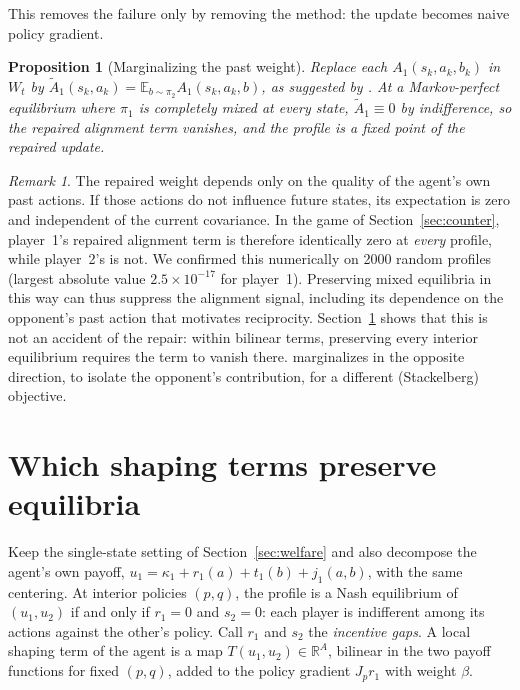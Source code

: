 \documentclass[11pt]{article}
\newtheorem{proposition}{Proposition}
\theoremstyle{remark}
\newtheorem{remark}{Remark}
\newcommand{\E}{\mathbb{E}}
\begin{document}
This removes the failure only by removing the method: the update becomes naive policy gradient.

\begin{proposition}[Marginalizing the past weight]\label{prop:past}
Replace each $A_1(s_k,a_k,b_k)$ in $W_t$ by $\tilde A_1(s_k,a_k)=\E_{b\sim\pi_2}A_1(s_k,a_k,b)$, as suggested by \citet{duque2026issue}. At a Markov-perfect equilibrium where $\pi_1$ is completely mixed at every state, $\tilde A_1\equiv 0$ by indifference, so the repaired alignment term vanishes, and the profile is a fixed point of the repaired update.
\end{proposition}

\begin{remark}
The repaired weight depends only on the quality of the agent's own past actions. If those actions do not influence future states, its expectation is zero and independent of the current covariance. In the game of Section~\ref{sec:counter}, player~1's repaired alignment term is therefore identically zero at \emph{every} profile, while player~2's is not. We confirmed this numerically on 2000 random profiles (largest absolute value $2.5\times10^{-17}$ for player~1). Preserving mixed equilibria in this way can thus suppress the alignment signal, including its dependence on the opponent's past action that motivates reciprocity. Section~\ref{sec:class} shows that this is not an accident of the repair: within bilinear terms, preserving every interior equilibrium requires the term to vanish there. \citet{piche2026thesis} marginalizes in the opposite direction, to isolate the opponent's contribution, for a different (Stackelberg) objective.
\end{remark}

\section{Which shaping terms preserve equilibria}\label{sec:class}

Keep the single-state setting of Section~\ref{sec:welfare} and also decompose the agent's own payoff, $u_1=\kappa_1+r_1(a)+t_1(b)+j_1(a,b)$, with the same centering. At interior policies $(p,q)$, the profile is a Nash equilibrium of $(u_1,u_2)$ if and only if $r_1=0$ and $s_2=0$: each player is indifferent among its actions against the other's policy. Call $r_1$ and $s_2$ the \emph{incentive gaps}. A local shaping term of the agent is a map $T(u_1,u_2)\in\mathbb R^{A}$, bilinear in the two payoff functions for fixed $(p,q)$, added to the policy gradient $J_p r_1$ with weight $\beta$.
\end{document}
